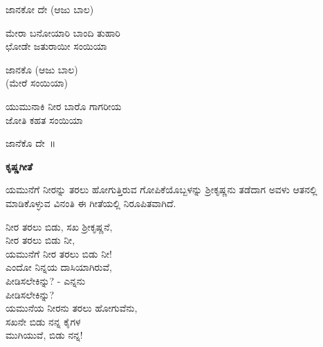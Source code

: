 \begin{flushright}
ಜಾನಕೋ ದೇ (ಆಜು ಬಾಲ)
\end{flushright}

\begin{myquote}
ಮೇರಾ ಬನೋಯಾರಿ ಬಾಂದಿ ತುಹಾರಿ\\ಛೋಡೇ ಜತುರಾಯೀ ಸಂಯಿಯಾ
\end{myquote}

\begin{flushright}
ಜಾನಕೊ (ಆಜು ಬಾಲ)\\(ಮೇರೆ ಸಂಯಿಯಾ)
\end{flushright}

\begin{myquote}
ಯುಮುನಾಕಿ ನೀರ ಬಾರೊ ಗಾಗರೀಯ\\ಜೋತಿ ಕಹತ ಸಂಯಿಯಾ
\end{myquote}

\begin{flushright}
ಜಾನೆಕೊ ದೇ~॥
\end{flushright}

\begin{center}
\textbf{ಕೃಷ್ಣಗೀತೆ}
\end{center}

ಯಮುನೆಗೆ ನೀರನ್ನು ತರಲು ಹೋಗುತ್ತಿರುವ ಗೋಪಿಕೆಯೊಬ್ಬಳನ್ನು ಶ‍್ರೀಕೃಷ್ಣನು ತಡೆದಾಗ ಅವಳು ಆತನಲ್ಲಿ ಮಾಡಿಕೊಳ್ಳುವ ವಿನಂತಿ ಈ ಗೀತೆಯಲ್ಲಿ ನಿರೂಪಿತವಾಗಿದೆ.

\begin{myquote}
ನೀರ ತರಲು ಬಿಡು, ಸಖ ಶ‍್ರೀಕೃಷ್ಣನೆ,\\ನೀರ ತರಲು ಬಿಡು ನೀ,\\ಯಮುನೆಗೆ ನೀರ ತರಲು ಬಿಡು ನೀ!\\ಎಂದೋ ನಿನ್ನಯ ದಾಸಿಯಾಗಿರುವೆ,\\ಪೀಡಿಸಲೇಕಿನ್ನು? - ಎನ್ನನು\\ಪೀಡಿಸಲೇಕಿನ್ನು?\\ಯಮುನೆಯ ನೀರನು ತರಲು ಹೋಗುವೆನು,\\ಸಖನೇ ಬಿಡು ನನ್ನ ಕೈಗಳ\\ಮುಗಿಯುವೆ, ಬಿಡು ನನ್ನ!
\end{myquote}

